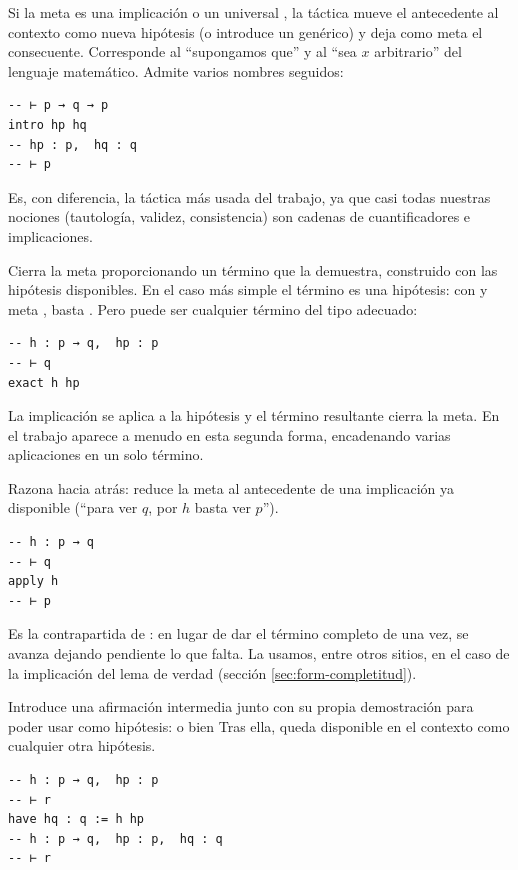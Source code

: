  Si la meta es una implicación  o un universal , la táctica  mueve el antecedente al contexto como nueva hipótesis  (o introduce un  genérico) y deja como meta el consecuente. Corresponde al ``supongamos que'' y al ``sea $x$ arbitrario'' del lenguaje matemático. Admite varios nombres seguidos:

\begin{lstlisting}
-- ⊢ p → q → p
intro hp hq
-- hp : p,  hq : q
-- ⊢ p
\end{lstlisting}

Es, con diferencia, la táctica más usada del trabajo, ya que casi todas nuestras nociones (tautología, validez, consistencia) son cadenas de cuantificadores e implicaciones.

 Cierra la meta proporcionando un término que la demuestra, construido con las hipótesis disponibles. En el caso más simple el término es una hipótesis: con  y meta , basta . Pero puede ser cualquier término del tipo adecuado:

\begin{lstlisting}
-- h : p → q,  hp : p
-- ⊢ q
exact h hp
\end{lstlisting}

La implicación se aplica a la hipótesis y el término resultante cierra la meta. En el trabajo aparece a menudo en esta segunda forma, encadenando varias aplicaciones en un solo término.

 Razona hacia atrás: reduce la meta al antecedente de una implicación ya disponible (``para ver $q$, por $h$ basta ver $p$'').

\begin{lstlisting}
-- h : p → q
-- ⊢ q
apply h
-- ⊢ p
\end{lstlisting}

Es la contrapartida de : en lugar de dar el término completo de una vez, se avanza dejando pendiente lo que falta. La usamos, entre otros sitios, en el caso de la implicación del lema de verdad (sección \ref{sec:form-completitud}).

 Introduce una afirmación intermedia junto con su propia demostración para poder usar como hipótesis:  o bien  Tras ella,  queda disponible en el contexto como cualquier otra hipótesis.

\begin{lstlisting}
-- h : p → q,  hp : p
-- ⊢ r
have hq : q := h hp
-- h : p → q,  hp : p,  hq : q
-- ⊢ r
\end{lstlisting}


